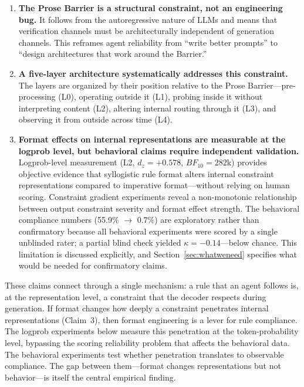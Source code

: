 \documentclass[11pt]{article}
\begin{document}
\begin{enumerate}
\item \textbf{The Prose Barrier is a structural constraint, not an engineering
  bug.} It follows from the autoregressive nature of LLMs and means that
  verification channels must be architecturally independent of generation
  channels. This reframes agent reliability from ``write better prompts'' to
  ``design architectures that work around the Barrier.''

\item \textbf{A five-layer architecture systematically addresses this
  constraint.} The layers are organized by their position relative to the
  Prose Barrier---pre-processing (L0), operating outside it (L1), probing inside
  it without interpreting content (L2), altering internal routing through it
  (L3), and observing it from outside across time (L4).

\item \textbf{Format effects on internal representations are measurable at the
  logprob level, but behavioral claims require independent validation.}
  Logprob-level measurement (L2, $d_z=+0.578$, $BF_{10}=282$k) provides objective
  evidence that syllogistic rule format alters internal constraint representations
  compared to imperative format---without relying on human scoring. Constraint
  gradient experiments reveal a non-monotonic relationship between output
  constraint severity and format effect strength. The behavioral compliance
  numbers (55.9\% $\to$ 0.7\%) are exploratory rather than confirmatory because
  all behavioral experiments were scored by a single unblinded rater; a partial
  blind check yielded $\kappa = -0.14$---below chance. This limitation is
  discussed explicitly, and Section~\ref{sec:whatweneed} specifies what would be
  needed for confirmatory claims.
\end{enumerate}

These claims connect through a single mechanism: a rule that an agent follows
is, at the representation level, a constraint that the decoder respects during
generation. If format changes how deeply a constraint penetrates internal
representations (Claim~3), then format engineering is a lever for rule compliance.
The logprob experiments below measure this penetration at the token-probability
level, bypassing the scoring reliability problem that affects the behavioral
data. The behavioral experiments test whether penetration translates to
observable compliance. The gap between them---format changes representations
but not behavior---is itself the central empirical finding.
\end{document}
